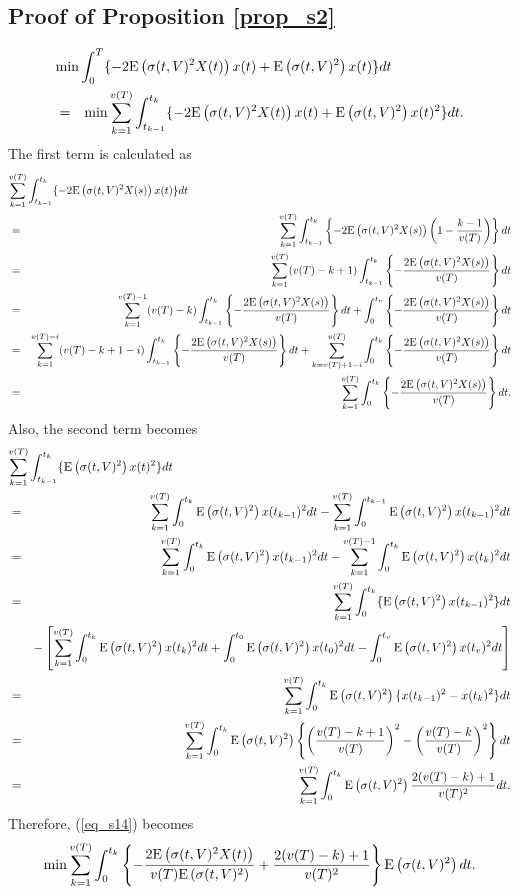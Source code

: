 \subsection{Proof of Proposition \ref{prop_s2}}
\begin{eqnarray*}\label{eq_s14}
  \lefteqn{\min\int_0^T \{-2\ex{\sigma(t,V)^2X(t)}x(t)+ \ex{\sigma(t,V)^2}x(t)\}dt} \\
    & = & \min \sum_{k=1}^{v(T)} \int_{t_{k-1}}^{t_k} \{-2 \ex{\sigma(t,V)^2X(t)}x(t)+ \ex{\sigma(t,V)^2}x(t)^2\}dt.
\end{eqnarray*}
The first term is calculated as
\begin{eqnarray*}
  \lefteqn{\sum_{k=1}^{v(T)} \int_{t_{k-1}}^{t_k} \{-2\ex{\sigma(t,V)^2X(s)}x(t)\}dt} \\
    & = & \sum_{k=1}^{v(T)} \int_{t_{k-1}}^{t_k} \left\{-2\ex{\sigma(t,V)^2X(s)}\left(1-\frac{k-1}{v(T)} \right) \right\} dt\\
    & = & \sum_{k=1}^{v(T)} (v(T)-k+1)\int_{t_{k-1}}^{t_k} \left\{-\frac{2
\ex{\sigma(t,V)^2X(s)}}{v(T)}\right\}dt\\
    & = & \sum_{k=1}^{v(T)-1} (v(T)-k)\int_{t_{k-1}}^{t_k} \left\{-\frac{2\ex{\sigma(t,V)^2X(s)}}{v(T)}\right\}dt+\int_0^{t_v} \left\{-\frac{2\ex{\sigma(t,V)^2X(s)}}{v(T)}\right\}dt \\
    & = & \sum_{k=1}^{v(T)-i} (v(T)-k+1-i)\int_{t_{k-1}}^{t_k} \left\{-\frac{2\ex{\sigma(t,V)^2X(s)}}{v(T)} \right\}dt+\sum_{k=v(T)+1-i}^{v(T)} \int_0^{t_k} \left\{-\frac{2\ex{\sigma(t,V)^2X(s)}}{v(T)}\right\}dt \\
    & = & \sum_{k=1}^{v(T)} \int_0^{t_k} \left\{-\frac{2\ex{\sigma(t,V)^2X(s)}}{v(T)}\right\}dt.
\end{eqnarray*}
Also, the second term becomes
\begin{eqnarray*}
   \lefteqn{\sum_{k=1}^{v(T)} \int_{t_{k-1}}^{t_k} \{ \ex{\sigma(t,V)^2}x(t)^2\}dt}\\
    & = & \sum_{k=1}^{v(T)} \int_0^{t_k} \ex{\sigma(t,V)^2}x(t_{k-1})^2 dt-\sum_{k=1}^{v(T)} \int_0^{t_{k-1}} \ex{\sigma(t,V)^2}x(t_{k-1})^2 dt\\
    & = & \sum_{k=1}^{v(T)} \int_0^{t_k} \ex{\sigma(t,V)^2}x(t_{k-1})^2 dt-\sum_{k=1}^{v(T)-1} \int_0^{t_k} \ex{\sigma(t,V)^2}x(t_k)^2 dt\\
    & = & \sum_{k=1}^{v(T)} \int_0^{t_k} \{ \ex{\sigma(t,V)^2}x(t_{k-1})^2\}dt\\
    &   & -\left[ \sum_{k=1}^{v(T)} \int_0^{t_k} \ex{\sigma(t,V)^2}x(t_k)^2 dt+\int_0^{t_0} \ex{\sigma(t,V)^2}x(t_0)^2 dt-\int_0^{t_v} \ex{\sigma(t,V)^2}x(t_v)^2 dt \right]\\
    & = & \sum_{k=1}^{v(T)} \int_0^{t_k} \ex{\sigma(t,V)^2} \{ x(t_{k-1})^2-x(t_k)^2 \}dt\\
    & = & \sum_{k=1}^{v(T)} \int_0^{t_k} \ex{\sigma(t,V)^2} \left\{ \left(\frac{v(T)-k+1}{v(T)}\right)^2-\left(\frac{v(T)-k}{v(T)}\right)^2 \right\} dt\\
    & = & \sum_{k=1}^{v(T)} \int_0^{t_k} \ex{\sigma(t,V)^2}\frac{2(v(T)-k)+1}{v(T)^2} dt.
\end{eqnarray*}
Therefore, (\ref{eq_s14}) becomes
\[
  \min \sum_{k=1}^{v(T)} \int_0^{t_k} \left\{ -\frac{2 {\mathrm{E}}\left( \sigma(t,V)^2X(t) \right)}{v(T)
{\mathrm{E}}\left( \sigma(t,V)^2 \right)}+\frac{2(v(T)-k)+1}{v(T)^2}\right\} {\mathrm{E}}\left( \sigma(t,V)^2 \right) dt.
\]

